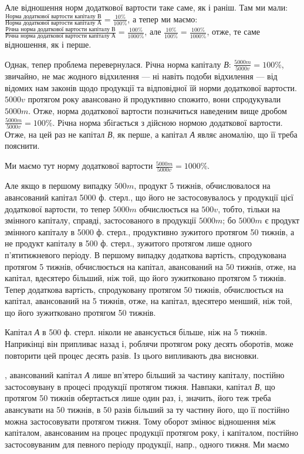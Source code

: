 \parcont{}  %
Але відношення норм додаткової вартости таке саме, як і раніш. Там ми мали:
$\frac{\text{Норма додаткової вартости капіталу }В}{\text{Норма додаткової вартости капіталу }А} =
\frac{10\%}{100\%}
$, а тепер ми маємо:
$\frac{\text{Річна норма додаткової вартости капіталу }В}{\text{Річна норма додаткової вартости капіталу }А} =
\frac{100\%}{1000\%}
$, але $\frac{10\%}{100\%} = \frac{100\%}{ 1000\%}$, отже, те саме відношення, як і перше.

Однак, тепер проблема перевернулася. Річна норма капіталу \emph{В}:
$\frac{5000m}{5000v} = 100\%$, звичайно, не має жодного відхилення — ні навіть
подоби відхилення — від відомих нам законів щодо продукції та відповідної
їй норми додаткової вартости. $5000v$ протягом року авансовано й
продуктивно спожито, вони спродукували $5000m$. Отже, норма додаткової
вартости позначиться наведеним вище дробом $\frac{5000m}{5000v} = 100\%$. Річна
норма збігається з дійсною нормою додаткової вартости. Отже, на цей
раз не капітал \emph{В}, як перше, а капітал \emph{А} являє аномалію, що її треба
пояснити.

Ми маємо тут норму додаткової вартости $\frac{5000m}{5000v} = 1000\%$.

Але якщо в першому випадку $500m$, продукт 5 тижнів, обчислювалося
на авансований капітал 5000 ф. стерл., що  його не застосовувалось
у продукції цієї додаткової вартости, то тепер $5000m$ обчислюється на $500v$,
тобто, тільки на  змінного капіталу, справді, застосованого в продукції
$5000m$; бо $5000m$ є продукт змінного капіталу в 5000 ф. стерл., продуктивно
зужитого протягом 50 тижнів, а не продукт капіталу в 500 ф. стерл.,
зужитого протягом лише одного п’ятитижневого періоду. В першому випадку
додаткова вартість, спродукована протягом 5 тижнів, обчислюється
на капітал, авансований на 50 тижнів, отже, на капітал, вдесятеро більший,
ніж той, що його зужитковано протягом 5 тижнів. Тепер додаткова вартість,
спродуковану протягом 50 тижнів, обчислюється на капітал, авансований
на 5 тижнів, отже, на капітал, вдесятеро менший, ніж той, що
його зужитковано протягом 50 тижнів.

Капітал \emph{А} в 500 ф. стерл. ніколи не авансується більше, ніж на 5 тижнів.
Наприкінці він припливає назад і, роблячи протягом року десять
оборотів, може повторити цей процес десять разів. Із цього випливають
два висновки.

, авансований капітал \emph{А} лише вп’ятеро більший за частину
капіталу, постійно застосовувану в процесі продукції протягом
тижня. Навпаки, капітал \emph{В}, що протягом 50 тижнів обертається лише
один раз, і, значить, його теж треба авансувати на 50 тижнів, в 50 разів
більший за ту частину його, що її постійно можна застосовувати протягом
тижня. Тому оборот змінює відношення між капіталом, авансованим
на процес продукції протягом року, і капіталом, постійно застосовуваним
для певного періоду продукції, напр., одного тижня. Ми маємо
\parbreak{}  %
